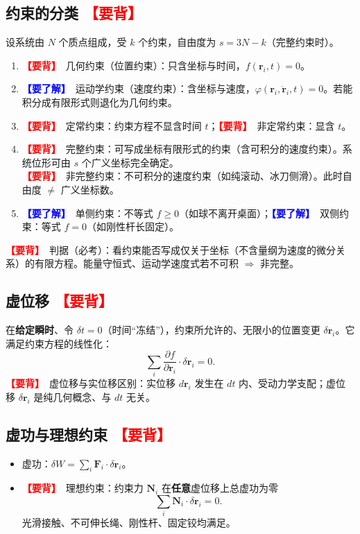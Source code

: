 \documentclass[UTF8,a4paper,11pt]{ctexart}
\newcommand{\bp}[1]{\textcolor{red}{\textbf{【要背】}}\ #1}
\newcommand{\uf}[1]{\textcolor{blue}{\textbf{【要了解】}}\ #1}
\begin{document}
\subsection{约束的分类 \bp{}}
设系统由 $N$ 个质点组成，受 $k$ 个约束，自由度为 $s=3N-k$（完整约束时）。
\begin{enumerate}[itemsep=2pt]
  \item \bp{几何约束（位置约束）}：只含坐标与时间，$f(\bm r_i,t)=0$。
  \item \uf{运动学约束（速度约束）}：含坐标与速度，$\varphi(\bm r_i,\dot{\bm r}_i,t)=0$。若能积分成有限形式则退化为几何约束。
  \item \bp{定常约束}：约束方程不显含时间 $t$；\bp{非定常约束}：显含 $t$。
  \item \bp{完整约束}：可写成坐标有限形式的约束（含可积分的速度约束）。系统位形可由 $s$ 个广义坐标完全确定。\\
        \bp{非完整约束}：不可积分的速度约束（如纯滚动、冰刀侧滑）。此时自由度 $\neq$ 广义坐标数。
  \item \uf{单侧约束}：不等式 $f\ge 0$（如球不离开桌面）；\uf{双侧约束}：等式 $f=0$（如刚性杆长固定）。
\end{enumerate}
\bp{判据（必考）}：看约束能否写成仅关于坐标（不含量纲为速度的微分关系）的有限方程。能量守恒式、运动学速度式若不可积 $\Rightarrow$ 非完整。

\subsection{虚位移 \bp{}}
在\textbf{给定瞬时}、令 $\delta t=0$（时间“冻结”），约束所允许的、无限小的位置变更 $\delta\bm r_i$。它满足约束方程的线性化：
\[
\sum_i \frac{\partial f}{\partial \bm r_i}\cdot \delta\bm r_i=0.
\]
\bp{虚位移与实位移区别}：实位移 $d\bm r_i$ 发生在 $dt$ 内、受动力学支配；虚位移 $\delta\bm r_i$ 是纯几何概念、与 $dt$ 无关。

\subsection{虚功与理想约束 \bp{}}
\begin{itemize}[itemsep=2pt]
  \item 虚功：$\delta W=\sum_i \bm F_i\cdot\delta\bm r_i$。
  \item \bp{理想约束}：约束力 $\bm N_i$ 在\textbf{任意}虚位移上总虚功为零
  \[
  \sum_i \bm N_i\cdot\delta\bm r_i=0.
  \]
  光滑接触、不可伸长绳、刚性杆、固定铰均满足。
\end{itemize}
\end{document}

